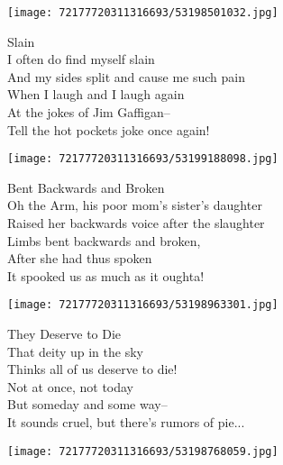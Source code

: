 \documentclass[10pt,letterpaper]{article}
\begin{document}
\begin{center}
\texttt{[image: 72177720311316693/53198501032.jpg]}
\end{center}

\begin{center}
Slain\\
\vskip 0.2in
I often do find myself slain\\
And my sides split and cause me such pain\\
When I laugh and I laugh again\\
At the jokes of Jim Gaffigan--\\
Tell the hot pockets joke once again!\\
\end{center}
\pagebreak

\begin{center}
\texttt{[image: 72177720311316693/53199188098.jpg]}
\end{center}

\begin{center}
Bent Backwards and Broken\\
\vskip 0.2in
Oh the Arm, his poor mom's sister's daughter\\
Raised her backwards voice after the slaughter\\
Limbs bent backwards and broken,\\
After she had thus spoken\\
It spooked us as much as it oughta!\\
\end{center}
\pagebreak

\begin{center}\texttt{[image: 72177720311316693/53198963301.jpg]}
\end{center}
\begin{center}
They Deserve to Die\\
\vskip 0.2in
That deity up in the sky\\
Thinks all of us deserve to die!\\
Not at once, not today\\
But someday and some way--\\
It sounds cruel, but there's rumors of pie...\\
\end{center}
\pagebreak

\begin{center}
\texttt{[image: 72177720311316693/53198768059.jpg]}
\end{center}
\end{document}
